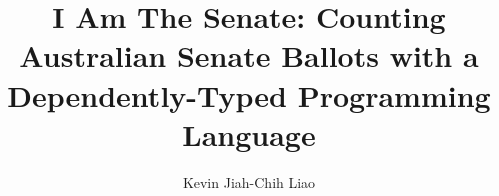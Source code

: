 \documentclass[a4paper,12pt,twoside]{report}
\begin{document}
\title{\LARGE {\bf I Am The Senate: Counting Australian Senate Ballots with a Dependently-Typed Programming Language}\\
 \vspace*{6mm}
}

\author{Kevin Jiah-Chih Liao}

\normallinespacing
\maketitle

\preface



% 





\appendix




\end{document}
